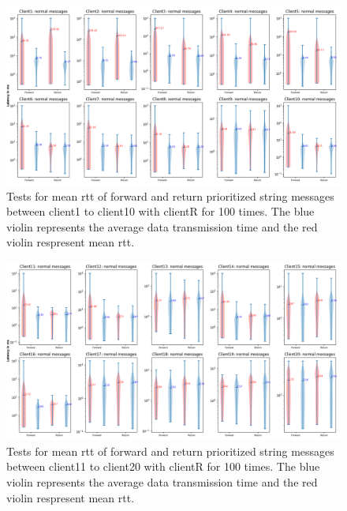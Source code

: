 \begin{figure}
    \centering
    \includegraphics[width=\textheight]{figures/appendix/priority_tests/log_violin_50clients_string_figure_1.png}\hfill 
    \caption{Tests for mean \gls{rtt} of forward and return prioritized string messages between client1 to client10 
    with clientR for 100 times. The blue violin represents the average data transmission time and the red violin 
    respresent mean \gls{rtt}.} \label{fig: priority-50clients-string-a}
\end{figure}

\begin{figure}
    \includegraphics[width=\textheight]{figures/appendix/priority_tests/log_violin_50clients_string_figure_2.png}\hfill 
    \caption{Tests for mean \gls{rtt} of forward and return prioritized string messages between client11 to client20 
    with clientR for 100 times. The blue violin represents the average data transmission time and the red violin 
    respresent mean \gls{rtt}.} \label{fig: priority-50clients-string-b}
\end{figure}

